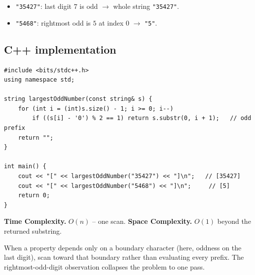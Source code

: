 
\begin{itemize}
  \item \texttt{"35427"}: last digit $7$ is odd $\to$ whole string
        \texttt{"35427"}.
  \item \texttt{"5468"}: rightmost odd is $5$ at index $0$ $\to$
        \texttt{"5"}.
\end{itemize}

\subsection*{C++ implementation}

\begin{lstlisting}
#include <bits/stdc++.h>
using namespace std;

string largestOddNumber(const string& s) {
    for (int i = (int)s.size() - 1; i >= 0; i--)
        if ((s[i] - '0') % 2 == 1) return s.substr(0, i + 1);   // odd prefix
    return "";
}

int main() {
    cout << "[" << largestOddNumber("35427") << "]\n";   // [35427]
    cout << "[" << largestOddNumber("5468") << "]\n";     // [5]
    return 0;
}
\end{lstlisting}

\begin{complexitybox}
\textbf{Time Complexity.} $O(n)$ -- one scan. \textbf{Space Complexity.}
$O(1)$ beyond the returned substring.
\end{complexitybox}

\begin{takeawaybox}
When a property depends only on a boundary character (here, oddness on the
last digit), scan toward that boundary rather than evaluating every prefix.
The rightmost-odd-digit observation collapses the problem to one pass.
\end{takeawaybox}

